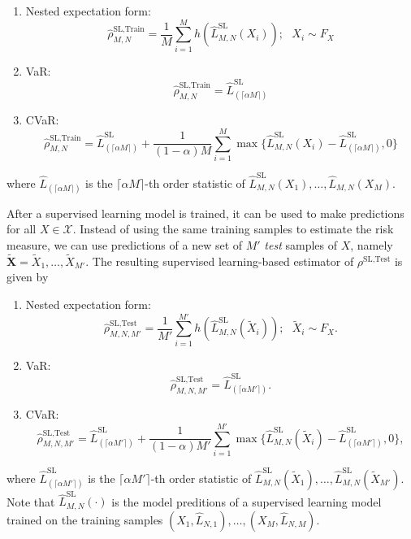 \begin{enumerate}
    \item   Nested expectation form:
            $$\hat{\rho}^{\text{SL}, \text{Train}}_{M, N} = \frac{1}{M} \sum_{i=1}^M h(\hat{L}^{\text{SL}}_{M, N}(X_i)); ~~~ X_i \sim F_X$$
    \item   VaR:
            $$\hat{\rho}^{\text{SL}, \text{Train}}_{M, N} = \hat{L}^{\text{SL}}_{(\lceil \alpha M \rceil)}$$
    \item   CVaR:
            $$\hat{\rho}^{\text{SL}, \text{Train}}_{M, N} = \hat{L}^{\text{SL}}_{(\lceil \alpha M \rceil)} + \frac{1}{(1-\alpha) M} \sum_{i=1}^M \max \{\hat{L}^{\text{SL}}_{M, N}(X_i) - \hat{L}^{\text{SL}}_{(\lceil \alpha M \rceil)}, 0 \}$$
\end{enumerate}
where $\hat{L}_{(\lceil \alpha M \rceil)}$ is the $\lceil \alpha M \rceil$-th order statistic of $\hat{L}^{\text{SL}}_{M, N}(X_1), \dots, \hat{L}_{M, N}(X_M)$.

After a supervised learning model is trained, it can be used to make predictions for all $X \in \mathcal{X}$.
Instead of using the same training samples to estimate the risk measure, we can use predictions of a new set of $M'$ \textit{test} samples of $X$, namely $\tilde{\mathbf{X}} = \tilde{X}_1, \dots, \tilde{X}_{M'}$.
The resulting supervised learning-based estimator of $\rho^{\text{SL}, \text{Test}}$ is given by

\begin{enumerate}
    \item   Nested expectation form:
            $$\hat{\rho}^{\text{SL}, \text{Test}}_{M, N, M'} = \frac{1}{M'} \sum_{i=1}^{M'} h(\hat{L}^{\text{SL}}_{M, N}(\tilde{X}_i)); ~~~ \tilde{X}_i \sim F_X.$$
    \item   VaR:
            $$\hat{\rho}^{\text{SL}, \text{Test}}_{M, N, M'} = \hat{L}^{\text{SL}}_{(\lceil \alpha M' \rceil)}.$$
    \item   CVaR:
            \begin{equation*}
                \hat{\rho}^{\text{SL}, \text{Test}}_{M, N, M'} 
                = \hat{L}^{\text{SL}}_{(\lceil \alpha M' \rceil)} 
                + \frac{1}{(1-\alpha) M'} \sum_{i=1}^{M'} \max \{\hat{L}^{\text{SL}}_{M, N}(\tilde{X}_i) - \hat{L}^{\text{SL}}_{(\lceil \alpha M' \rceil)}, 0 \}, 
            \end{equation*}
\end{enumerate}
where $\hat{L}^{\text{SL}}_{(\lceil \alpha M' \rceil)}$ is the $\lceil \alpha M' \rceil$-th order statistic of $\hat{L}^{\text{SL}}_{M, N}(\tilde{X}_1), \dots, \hat{L}^{\text{SL}}_{M, N}(\tilde{X}_{M'})$. 
Note that $\hat{L}^{\text{SL}}_{M, N}(\cdot)$ is the model preditions of a supervised learning model trained on the training samples $(X_1, \hat{L}_{N, 1}), \dots, (X_M, \hat{L}_{N, M})$.


